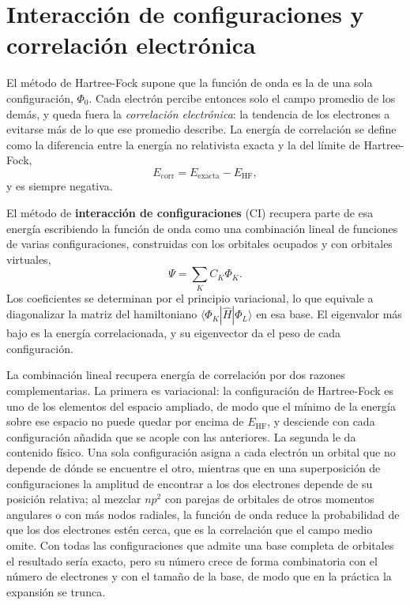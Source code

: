 \section[Interacción de configuraciones y correlación electrónica]{Interacción de configuraciones y\\ correlación electrónica}
\label{sec:ci_teoria}

El método de Hartree-Fock supone que la función de onda es la de una sola configuración, $\Phi_0$. Cada electrón percibe entonces solo el campo promedio de los demás, y queda fuera la \textit{correlación electrónica}: la tendencia de los electrones a evitarse más de lo que ese promedio describe. La energía de correlación se define como la diferencia entre la energía no relativista exacta y la del límite de Hartree-Fock,
\begin{equation}
    E_{\text{corr}} = E_{\text{exacta}} - E_{\text{HF}},
\end{equation}
y es siempre negativa.

El método de \textbf{interacción de configuraciones} (CI) recupera parte de esa energía escribiendo la función de onda como una combinación lineal de funciones de varias configuraciones, construidas con los orbitales ocupados y con orbitales virtuales,
\begin{equation}
    \label{eq:expansion_ci}
    \Psi = \sum_K C_K \Phi_K .
\end{equation}
Los coeficientes se determinan por el principio variacional, lo que equivale a diagonalizar la matriz del hamiltoniano $\langle \Phi_K | \hat{H} | \Phi_L \rangle$ en esa base. El eigenvalor más bajo es la energía correlacionada, y su eigenvector da el peso de cada configuración.

La combinación lineal recupera energía de correlación por dos razones complementarias. La primera es variacional: la configuración de Hartree-Fock es uno de los elementos del espacio ampliado, de modo que el mínimo de la energía sobre ese espacio no puede quedar por encima de $E_{\text{HF}}$, y desciende con cada configuración añadida que se acople con las anteriores. La segunda le da contenido físico. Una sola configuración asigna a cada electrón un orbital que no depende de dónde se encuentre el otro, mientras que en una superposición de configuraciones la amplitud de encontrar a los dos electrones depende de su posición relativa; al mezclar $np^2$ con parejas de orbitales de otros momentos angulares o con más nodos radiales, la función de onda reduce la probabilidad de que los dos electrones estén cerca, que es la correlación que el campo medio omite. Con todas las configuraciones que admite una base completa de orbitales el resultado sería exacto, pero su número crece de forma combinatoria con el número de electrones y con el tamaño de la base, de modo que en la práctica la expansión se trunca.

